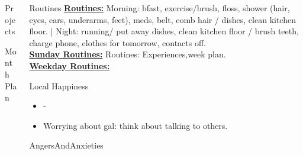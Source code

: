 \begin{columns}  %


\begin{column}{0.10\linewidth}


\begin{block}{Projects}

\end{block}


\begin{block}{Month Plan}

\end{block}

\end{column}
  \begin{column}{0.10\linewidth}
    \begin{block}{Routines}
      { \tiny \underline{\bf Routines:} Morning: bfast, exercise/brush,
        floss, shower (hair, eyes, ears, underarms, feet), meds, belt,
        comb hair / dishes, clean kitchen floor. |  Night: running/ put
        away dishes, clean kitchen floor / brush teeth, charge phone,
        clothes for tomorrow, contacts off.}\\
      {\tiny \underline{\bf Sunday Routines:} Routines:
        Experiences,week plan.}\\ 
      {\tiny \underline{\bf Weekday Routines:}}\\
    \end{block} 
    \begin{block}{Local Happiness}
      \begin{itemize} 
        \tiny \item \tiny -
      \item \tiny Worrying about gal: think about talking to others.
      \end{itemize} 
    \end{block}
    \begin{block}{AngersAndAnxieties}

\end{block}
\end{column}
\end{columns}
